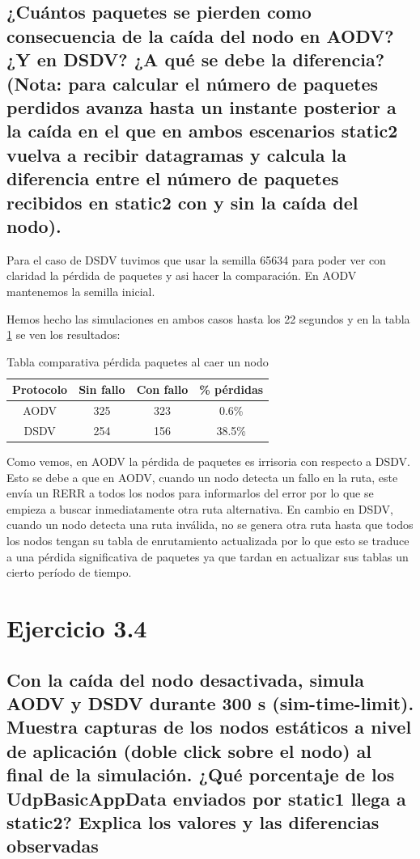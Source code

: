 \subsection{¿Cuántos paquetes se pierden como consecuencia de la caída del nodo en AODV? ¿Y en DSDV? ¿A qué se
debe la diferencia? (Nota: para calcular el número de paquetes perdidos avanza hasta un instante posterior a la
caída en el que en ambos escenarios static2 vuelva a recibir datagramas y calcula la diferencia entre el número
de paquetes recibidos en static2 con y sin la caída del nodo).}

Para el caso de DSDV tuvimos que usar la semilla 65634 para poder ver con claridad la pérdida de paquetes y asi hacer la comparación. En AODV mantenemos la semilla inicial.

Hemos hecho las simulaciones en ambos casos hasta los 22 segundos y en la tabla \ref{tabla1} se ven los resultados:

\begin{table}[H]
    \centering
    \begin{tabular}{|c|c|c|c|}
    \hline
    Protocolo & Sin fallo & Con fallo & \% pérdidas \\ \hline
      AODV    &   325     &   323     &     0.6\%   \\ \hline
      DSDV    &   254     &   156     &     38.5\%  \\ \hline
    \end{tabular}
    \caption{Tabla comparativa pérdida paquetes al caer un nodo}
    \label{tabla1}
\end{table}

Como vemos, en AODV la pérdida de paquetes es irrisoria con respecto a DSDV. Esto se debe a que en AODV, cuando un nodo detecta un fallo en la ruta, este envía un RERR a todos los nodos para informarlos del error por lo que se empieza a buscar inmediatamente otra ruta alternativa. En cambio en DSDV, cuando un nodo detecta una ruta inválida, no se genera otra ruta hasta que todos los nodos tengan su tabla de enrutamiento actualizada por lo que esto se traduce a una pérdida significativa de paquetes ya que tardan en actualizar sus tablas un cierto período de tiempo. 

\section{Ejercicio 3.4}

\subsection{Con la caída del nodo desactivada, simula AODV y DSDV durante 300 s (sim-time-limit). Muestra
capturas de los nodos estáticos a nivel de aplicación (doble click sobre el nodo) al final de la simulación. ¿Qué
porcentaje de los UdpBasicAppData enviados por static1 llega a static2? Explica los valores y las diferencias
observadas}

